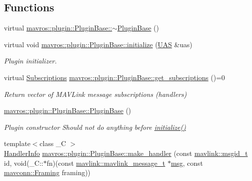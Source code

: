 \subsection*{Functions}
\begin{DoxyCompactItemize}
\item 
virtual \mbox{\hyperlink{group__plugin_gad79dda3665b106d020b938fab5a6a5a5}{mavros\+::plugin\+::\+Plugin\+Base\+::$\sim$\+Plugin\+Base}} ()
\item 
virtual void \mbox{\hyperlink{group__plugin_gad5313a41da4d26acbbabf008cdc21e82}{mavros\+::plugin\+::\+Plugin\+Base\+::initialize}} (\mbox{\hyperlink{classmavros_1_1UAS}{U\+AS}} \&uas)
\begin{DoxyCompactList}\small\item\em Plugin initializer. \end{DoxyCompactList}\item 
virtual \mbox{\hyperlink{group__plugin_ga8967d61fc77040e0c3ea5a4585d62a09}{Subscriptions}} \mbox{\hyperlink{group__plugin_gaf4e23fec6d7436a62cbf0942a2e5791c}{mavros\+::plugin\+::\+Plugin\+Base\+::get\+\_\+subscriptions}} ()=0
\begin{DoxyCompactList}\small\item\em Return vector of M\+A\+V\+Link message subscriptions (handlers) \end{DoxyCompactList}\item 
\mbox{\hyperlink{group__plugin_gac37e1a835763608688df9b6b6806917b}{mavros\+::plugin\+::\+Plugin\+Base\+::\+Plugin\+Base}} ()
\begin{DoxyCompactList}\small\item\em Plugin constructor Should not do anything before \mbox{\hyperlink{group__plugin_gad5313a41da4d26acbbabf008cdc21e82}{initialize()}} \end{DoxyCompactList}\item 
{\footnotesize template$<$class \+\_\+C $>$ }\\\mbox{\hyperlink{group__plugin_gab973eb02b8f26a7b2b9cea37924317f1}{Handler\+Info}} \mbox{\hyperlink{group__plugin_gac7d70e0432c00220da41948757a35a50}{mavros\+::plugin\+::\+Plugin\+Base\+::make\+\_\+handler}} (const \mbox{\hyperlink{namespacemavlink_a98a1fe49b380ed1ea252d2c13bf3278d}{mavlink\+::msgid\+\_\+t}} id, void(\+\_\+\+C\+::$\ast$fn)(const \mbox{\hyperlink{include__v0_89_2mavlink__types_8h_a63b963764c09dc72f4910c1521e325b9}{mavlink\+::mavlink\+\_\+message\+\_\+t}} $\ast$\mbox{\hyperlink{stratnode_8cpp_a82cfe4ed9bc9e1b07c8bf209c324d85b}{msg}}, const \mbox{\hyperlink{group__mavconn_gac93e6f8262bcc6008b4882ae6213f494}{mavconn\+::\+Framing}} framing))

\end{DoxyCompactItemize}
